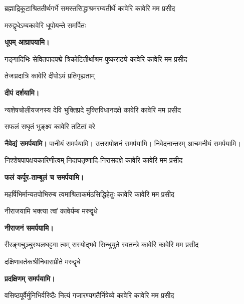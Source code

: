 \begin{center}
\begin{center}

{ब्रह्माद्रिकूटाश्रिततीर्थगर्भे}
{समस्तसिद्धाश्रमरम्यतीर्थे}
{कावेरि कावेरि मम प्रसीद}

{मरुद्वृधेऽम्बकावेरि धूपोयन्ते समर्पितः}

\textbf{\devAya{} धूपम् आघ्रापयामि।}

{गङ्गादिभिः सेवितपादपद्मे}
{त्रिकोटितीर्थाश्रम-पुष्कराढ्ये}
{कावेरि कावेरि मम प्रसीद}

{तेजःप्रदात्रि कावेरि दीपोऽयं प्रतिगृह्यताम्}

\textbf{\devAya{} दीपं दर्शयामि।}

{न्यशेषचोलीयजनस्य देवि}
{भुक्तिप्रदे मुक्तिविधानदक्षे}
{कावेरि कावेरि मम प्रसीद}

{सफलं सघृतं भुङ्क्ष्व कावेरि तटितां वरे}

\textbf{\devAya{} नैवेद्यं समर्पयामि।} पानीयं समर्पयामि। उत्तरापोशनं समर्पयामि। निवेदनान्तरम् आचमनीयं समर्पयामि।

{निश्शेषपापक्षयकारिणीत्वम्}
{निदाघतृष्णादि-निरासदक्षे}
{कावेरि कावेरि मम प्रसीद}

\textbf{\devAya{} फलं कर्पूर-ताम्बूलं च समर्पयामि।}

{महर्षिभिर्मान्यतपोभिरम्ब}
{त्वमाश्रिताकर्मठसिद्धिहेतुः}
{कावेरि कावेरि मम प्रसीद}

{नीराजयामि भक्त्या त्वां कावेर्यम्ब मरुद्वृधे}

\textbf{\devAya{} नीराजनं समर्पयामि।}

{रीरङ्गचुञ्चुस्थलघट्टगा त्वम्}
{सस्योद्भवे सिन्धुयुते स्वतन्त्रे}
{कावेरि कावेरि मम प्रसीद}

{दक्षिणावर्तकश्रीनिवासप्रीते मरुद्वृधे}

\textbf{\devAya{} प्रदक्षिणम् समर्पयामि।}

{वसिष्ठपूर्वैर्मुनिभिर्वरिष्ठैः}
{नित्यं गजारण्यगतैर्निषेव्ये}
{कावेरि कावेरि मम प्रसीद}


\end{center}
\end{center}
